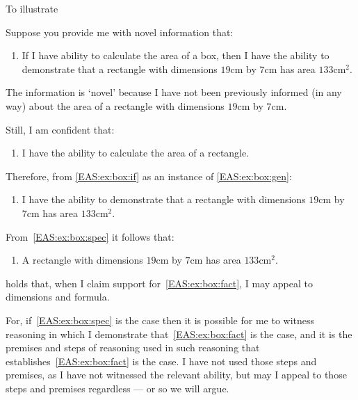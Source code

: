 \begin{note}
  To illustrate \EAS{}

  \begin{illustration}\label{ill:rectangle:ability}
    Suppose you provide me with novel information that:
    \begin{enumerate}[label=\emph{A}\arabic*., ref=(\emph{A}\arabic*), series=EAS_counter]
    \item\label{EAS:ex:box:if} If I have ability to calculate the area of a box, then I have the ability to demonstrate that a rectangle with dimensions \(19\text{cm}\) by \(7\text{cm}\) has area \(133\text{cm}^{2}\).
    \end{enumerate}
    The information is `novel' because I have not been previously informed (in any way) about the area of a rectangle with dimensions \(19\text{cm}\) by \(7\text{cm}\).

    Still, I am confident that:
    \begin{enumerate}[label=\emph{A}\arabic*., ref=(\emph{A}\arabic*), resume*=EAS_counter]
    \item\label{EAS:ex:box:gen} I have the ability to calculate the area of a rectangle.
    \end{enumerate}
    Therefore, from \ref{EAS:ex:box:if} as an instance of \ref{EAS:ex:box:gen}:
    \begin{enumerate}[label=\emph{A}\arabic*., ref=(\emph{A}\arabic*), resume*=EAS_counter]
    \item\label{EAS:ex:box:spec} I have the ability to demonstrate that a rectangle with dimensions \(19\text{cm}\) by \(7\text{cm}\) has area \(133\text{cm}^{2}\).
    \end{enumerate}
    From~\ref{EAS:ex:box:spec} it follows that:
    \begin{enumerate}[label=\emph{A}\arabic*., ref=(\emph{A}\arabic*), resume*=EAS_counter]
    \item\label{EAS:ex:box:fact} A rectangle with dimensions \(19\text{cm}\) by \(7\text{cm}\) has area \(133\text{cm}^{2}\).
    \end{enumerate}
  \end{illustration}

  \EAS{} holds that, when I claim support for~\ref{EAS:ex:box:fact}, I may appeal to dimensions and formula.

  For, if~\ref{EAS:ex:box:spec} is the case then it is possible for me to witness reasoning in which I demonstrate that~\ref{EAS:ex:box:fact} is the case, and it is the premises and steps of reasoning used in such reasoning that establishes~\ref{EAS:ex:box:fact} is the case.
  I have not used those steps and premises, as I have not witnessed the relevant ability, but may I appeal to those steps and premises regardless --- or so we will argue.


\end{note}
